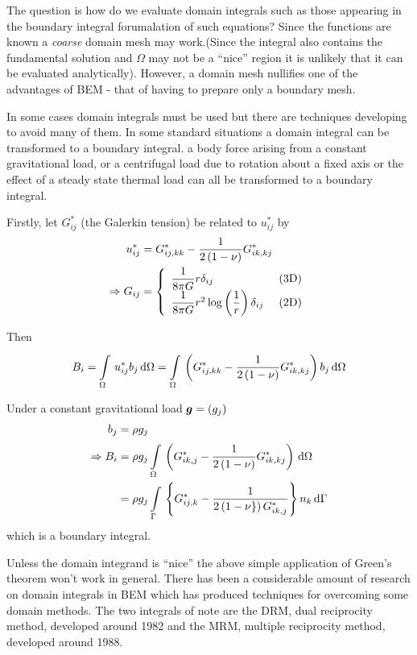The question is how do we evaluate domain integrals such as those appearing in
the boundary integral forumalation of such equations?  Since the functions are
known a \emph{coarse} domain mesh may work.(\nb Since the integral also
contains the fundamental solution and $\Omega$ may not be a ``nice'' region it
is unlikely that it can be evaluated analytically). However, a domain mesh
nullifies one of the advantages of BEM - that of having to prepare only a
boundary mesh.

In some cases domain integrals must be used but there are techniques
developing to avoid many of them.  In some standard situations a domain
integral can be transformed to a boundary integral. \eg a body force arising
from a constant gravitational load, or a centrifugal load due to rotation
about a fixed axis or the effect of a steady state thermal load can all be
transformed to a boundary integral.

Firstly, let $G_{ij}^{*}$ (the Galerkin tension) be related to $u_{ij}^{*}$ by
\begin{align*}
    u_{ij}^{*} &= G_{ij,kk}^{*} -  \dfrac{1}{2\left( 1-\nu \right)}G_{ik,kj}^{*} \\
    \Rightarrow G_{ij} &=
    \left\{ \begin{array}{ll}
        \dfrac{1}{8 \pi G} r \delta_{ij} & \text{ (3D)}\\
        \dfrac{1}{8 \pi G}  r^{2} \log \left( \dfrac{1}{r} \right) \delta_{ij}
        & \text{ (2D)}
      \end{array} \right.
\end{align*}

Then
\begin{displaymath}
  B_{i}  =  \goneint{u_{ij}^{*} b_{j}}{\Omega} =   
  \goneint{\pbrac{G_{ij,kk}^{*} -\dfrac{1}{2\pbrac{1-\nu}} G_{ik,kj}^{*}}
  b_{j}}{\Omega}
\end{displaymath} 

Under a constant gravitational load $ \boldsymbol{g} =\left( g_{j} \right)$
\begin{align*}
  b_{j} &= \rho g_{j}\\
  \Rightarrow B_{i} &= \rho g_{j} \goneint{\pbrac{G_{ik,j}^{*} 
  -\dfrac{1}{2\pbrac{1-\nu}} G_{ik,kj}^{*}}}{\Omega} \\
  &= \rho g_{j} \goneint{\bbrac{G_{ij,k}^{*} -\dfrac{1}{2\pbrac{1-\nu\}} 
  G_{ik,j}^{*}}}n_{k}}{\Gamma}
\end{align*}
which is a boundary integral. 

Unless the domain integrand is ``nice'' the above simple application of
Green's theorem won't work in general. There has been a considerable amount of
research on domain integrals in BEM which has produced techniques for
overcoming some domain methods. The two integrals of note are the DRM, dual
reciprocity method, developed around 1982 and the MRM, multiple reciprocity
method, developed around 1988.

